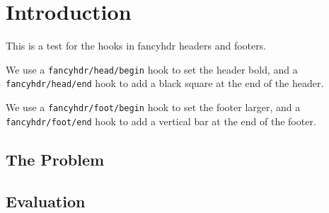 \documentclass{book}
\begin{document}
\chapter{Introduction}

\begin{boxedminipage}{\textwidth}
This is a test for the hooks in fancyhdr headers and footers.

We use a \texttt{fancyhdr/head/begin} hook to set the header bold,
and a \texttt{fancyhdr/head/end} hook to add a black square at the end of the header.

We use a \texttt{fancyhdr/foot/begin} hook to set the footer larger,
and a \texttt{fancyhdr/foot/end} hook to add a vertical bar at the end of the footer.

\end{boxedminipage}

\section{The Problem}
\label{sec:problem}

\lipsum[1]

\section{Evaluation}

\lipsum
\end{document}
